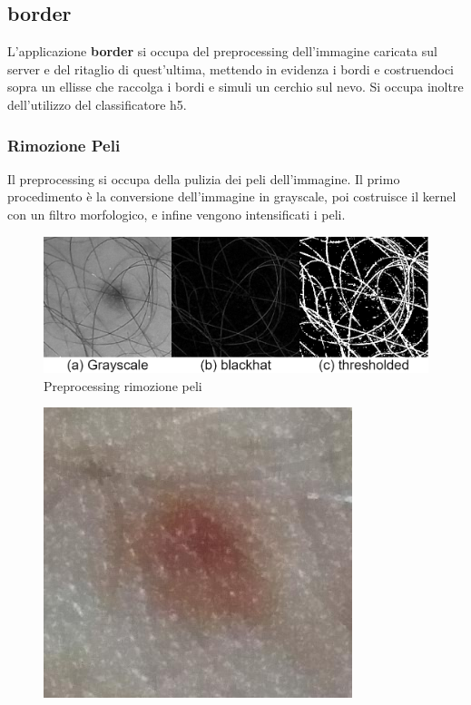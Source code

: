 {\subsection{border}
L'applicazione \textbf{border} si occupa del preprocessing dell'immagine caricata sul server e del ritaglio di quest'ultima, mettendo in evidenza i bordi e costruendoci sopra un ellisse che raccolga i bordi e simuli un cerchio sul nevo.
Si occupa inoltre dell'utilizzo del classificatore h5.
\subsubsection{Rimozione Peli}
Il preprocessing si occupa della pulizia dei peli dell'immagine.
Il primo procedimento è la conversione dell'immagine in grayscale, poi costruisce il kernel con un filtro morfologico, e infine vengono intensificati i peli.
\begin{figure}[h]
	\begin{center}
		\includegraphics[scale=0.4]{figure/capitolo6/border1.png}
	\end{center}
	\caption{Preprocessing rimozione peli}	
\end{figure}
\begin{figure}[h]
	\begin{center}
		\includegraphics[scale=0.4]{figure/capitolo6/border2.jpg}

\end{center}
\end{figure}}
